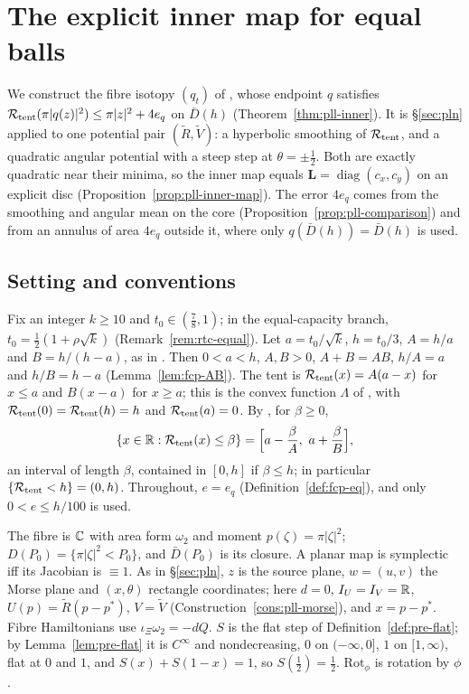 \section{The explicit inner map for equal balls}\label{sec:pll}

We construct the fibre isotopy $(q_t)$ of , whose endpoint $q$ satisfies $\mathcal{R}_{\rm tent}(\pi|q(z)|^2)\le\pi|z|^2+4e_q$ on $\bar D(h)$ (Theorem~\ref{thm:pll-inner}). It is \S\ref{sec:pln} applied to one potential pair $(\tilde R,\tilde V)$: a hyperbolic smoothing of $\mathcal{R}_{\rm tent}$, and a quadratic angular potential with a steep step at $\theta=\pm\frac12$. Both are exactly quadratic near their minima, so the inner map equals $\mathbf L=\operatorname{diag}(c_x,c_y)$ on an explicit disc (Proposition~\ref{prop:pll-inner-map}). The error $4e_q$ comes from the smoothing and angular mean on the core (Proposition~\ref{prop:pll-comparison}) and from an annulus of area $4e_q$ outside it, where only $q(\bar D(h))=\bar D(h)$ is used.

\subsection{Setting and conventions}\label{sec:pll-setting}

Fix an integer $k\ge10$ and $t_0\in(\frac78,1)$; in the equal-capacity branch, $t_0=\frac12(1+\rho\sqrt k)$ (Remark~\ref{rem:rtc-equal}). Let $a=t_0/\sqrt k$, $h=t_0/3$, $A=h/a$ and $B=h/(h-a)$, as in . Then $0<a<h$, $A,B>0$, $A+B=AB$, $h/A=a$ and $h/B=h-a$ (Lemma~\ref{lem:fcp-AB}). The tent is $\mathcal{R}_{\rm tent}(x)=A(a-x)$ for $x\le a$ and $B(x-a)$ for $x\ge a$; this is the convex function $\Lambda$ of , with $\mathcal{R}_{\rm tent}(0)=\mathcal{R}_{\rm tent}(h)=h$ and $\mathcal{R}_{\rm tent}(a)=0$. By , for $\beta\ge0$,
\begin{equation}\label{eq:pll-sublevel}
 \{x\in\R:\Rcal_{\rm tent}(x)\le\beta\}=\Bigl[a-\frac\beta A,\ a+\frac\beta B\Bigr],
\end{equation}
an interval of length $\beta$, contained in $[0,h]$ if $\beta\le h$; in particular $\{\mathcal{R}_{\rm tent}<h\}=(0,h)$. Throughout, $e=e_q$ (Definition~\ref{def:fcp-eq}), and only $0<e\le h/100$ is used.

The fibre is $\mathbb{C}$ with area form $\omega_2$ and moment $p(\zeta)=\pi|\zeta|^2$; $D(P_0)=\{\pi|\zeta|^2<P_0\}$, and $\bar D(P_0)$ is its closure. A planar map is symplectic iff its Jacobian is $\equiv1$. As in \S\ref{sec:pln}, $z$ is the source plane, $w=(u,v)$ the Morse plane and $(x,\theta)$ rectangle coordinates; here $d=0$, $I_U=I_V=\mathbb{R}$, $U(p)=\tilde R(p-p^*)$, $V=\tilde V$ (Construction~\ref{cons:pll-morse}), and $x=p-p^*$. Fibre Hamiltonians use $\iota_\Xi\omega_2=-dQ$. $S$ is the flat step of Definition~\ref{def:pre-flat}; by Lemma~\ref{lem:pre-flat} it is $C^\infty$ and nondecreasing, $0$ on $(-\infty,0]$, $1$ on $[1,\infty)$, flat at $0$ and $1$, and $S(x)+S(1-x)=1$, so $S(\frac12)=\frac12$. $\mathrm{Rot}_\phi$ is rotation by $\phi$.

